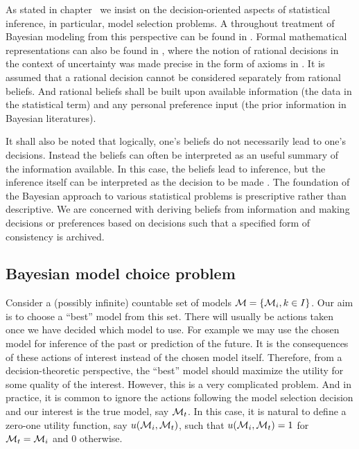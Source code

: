 \documentclass[10pt, hyper, bib, fontset=Lucida,
linespread=1.3, typearearatio=0.75]{marticle}
\begin{document}
As stated in chapter~ we insist on the decision-oriented
aspects of statistical inference, in particular, model selection problems. A
throughout treatment of Bayesian modeling from this perspective can be found
in \textcite{Robert:2007tc}. Formal mathematical representations can also be
found in \textcite[][sec.~5.1 and sec.~6.1]{Bernardo:1994vd}, where the notion
of rational decisions in the context of uncertainty was made precise in the
form of axioms in \textcite[][chap.~2]{Bernardo:1994vd}. It is assumed that a
rational decision cannot be considered separately from rational beliefs. And
rational beliefs shall be built upon available information (the data in the
statistical term) and any personal preference input (the prior information in
Bayesian literatures).

It shall also be noted that logically, one's beliefs do not necessarily lead
to one's decisions. Instead the beliefs can often be interpreted as an useful
summary of the information available. In this case, the beliefs lead to
inference, but the inference itself can be interpreted as the decision to be
made \parencite[][chap.~1]{Lehmann:2005vy}. The foundation of the Bayesian
approach to various statistical problems is prescriptive rather than
descriptive. We are concerned with deriving beliefs from information and
making decisions or preferences based on decisions such that a specified form
of consistency is archived.

\subsection{Bayesian model choice problem}
\label{sub:Bayesian model choice problem}

Consider a (possibly infinite) countable set of models $\mathcal{M} = \{\mathcal{M}_i,
  k\in I\}$. Our aim is to choose a ``best'' model from this set. There will
usually be actions taken once we have decided which model to use. For example
we may use the chosen model for inference of the past or prediction of the
future. It is the consequences of these actions of interest instead of the
chosen model itself. Therefore, from a decision-theoretic perspective, the
``best'' model should maximize the utility for some quality of the interest.
However, this is a very complicated problem. And in practice, it is common to
ignore the actions following the model selection decision and our interest is
the true model, say $\mathcal{M}_t$. In this case, it is natural to define a
zero-one utility function, say $u(\mathcal{M}_i,\mathcal{M}_t)$, such that
$u(\mathcal{M}_i,\mathcal{M}_t) = 1$ for $\mathcal{M}_t = \mathcal{M}_i$ and $0$ otherwise.
\end{document}
